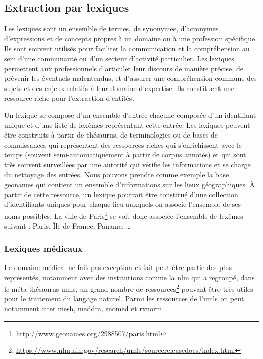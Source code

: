 \subsection{Extraction par lexiques}
\label{sec:ie:lexicon}

Les lexiques sont un ensemble de termes, de synonymes, d'acronymes, d'expressions et de concepts propres à un domaine ou à une profession spécifique.
Ils sont souvent utilisés pour faciliter la communication et la compréhension au sein d'une communauté ou d'un secteur d'activité particulier.
Les lexiques permettent aux professionnels d'articuler leur discours de manière précise, de prévenir les éventuels malentendus, et d'assurer une compréhension commune des sujets et des enjeux relatifs à leur domaine d'expertise.
Ils constituent une ressource riche pour l'extraction d'entités.

Un lexique se compose d'un ensemble d'entrée chacune composée d'un identifiant unique et d'une liste de lexèmes représentant cette entrée.
Les lexiques peuvent être construits à partir de thésaurus, de terminologies ou de bases de connaissances qui représentent des ressources riches qui s'enrichissent avec le temps (souvent semi-automatiquement à partir de corpus annotés) et qui sont très souvent surveillées par une autorité qui vérifie les informations et se charge du nettoyage des entrées.
Nous pouvons prendre comme exemple la base \gls{geonames} qui contient un ensemble d'informations sur les lieux géographiques.
À partir de cette ressource, un lexique pourrait être constitué d'une collection d'identifiants uniques pour chaque lieu auxquels on associe l'ensemble de ses noms possibles.
La ville de Paris\footnote{\url{http://www.geonames.org/2988507/paris.html}} se voit donc associée l'ensemble de lexèmes suivant : Paris, Île-de-France, Paname, \dots

\subsubsection{Lexiques médicaux}

Le domaine médical ne fait pas exception et fait peut-être partie des plus représentés, notamment avec des institutions comme la \gls{nlm} qui a regroupé, dans le méta-thésaurus \gls{umls}, un grand nombre de ressources\footnote{\url{https://www.nlm.nih.gov/research/umls/sourcereleasedocs/index.html}} pouvant être très utiles pour le traitement du langage naturel.
Parmi les ressources de l'\gls{umls} on peut notamment citer \gls{mesh}, \gls{meddra}, \gls{snomed} et \gls{rxnorm}.

